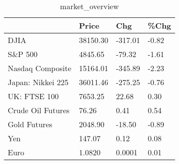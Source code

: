 \documentclass{article}%
\begin{document}
%


\begin{table}[htbp]%
\caption{market\_overview}%
\centering%
\begin{adjustbox}{width=1\textwidth}%
\begin{tabular}{llll}
\toprule
                  &    Price &     Chg &  \%Chg \\
\midrule
             DJIA & 38150.30 & -317.01 & -0.82 \\
          S\&P 500 &  4845.65 &  -79.32 & -1.61 \\
 Nasdaq Composite & 15164.01 & -345.89 & -2.23 \\
Japan: Nikkei 225 & 36011.46 & -275.25 & -0.76 \\
     UK: FTSE 100 &  7653.25 &   22.68 &  0.30 \\
Crude Oil Futures &    76.26 &    0.41 &  0.54 \\
     Gold Futures &  2048.90 &  -18.50 & -0.89 \\
              Yen &   147.07 &    0.12 &  0.08 \\
             Euro &   1.0820 &  0.0001 &  0.01 \\
\bottomrule
\end{tabular}
%
\end{adjustbox}%
\end{table}

%
\end{document}
